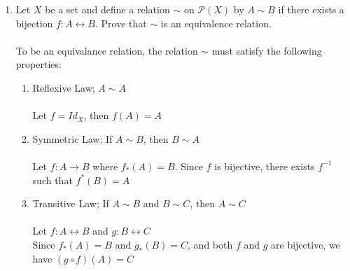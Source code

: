 \documentclass[11pt]{article}
\begin{document}
\begin{enumerate}
\newpage
\item Let $X$ be a set and define a relation $\sim$ on $\mathcal{P}(X)$ by $A \sim B$ if there exists a bijection $f:A \leftrightarrow B$.  Prove that $\sim$ is an equivalence relation.
\\\\
To be an equivalance relation, the relation $\sim$ must satisfy the following properties:
\begin{enumerate}
\item Reflexive Law; $A \sim A$\\
\\
Let $f = Id_X$, then $f(A) = A$\\
\item Symmetric Law; If $A \sim B$, then $B \sim A$\\
\\Let $f:A \to B$ where $f_*(A) = B$.  Since $f$ is bijective, there exists $f^{-1}$ such that 	$f^*(B) = A$
\\
\item Transitive Law; If $A \sim B$ and $B \sim C$, then $A \sim C$\\
\\
Let $f:A \leftrightarrow B$ and $g:B \leftrightarrow C$
\\
Since $f_*(A) = B$ and $g_*(B) = C$, and both $f$ and $g$ are bijective, we have $(g \circ f)(A) = C$
\end{enumerate}
\end{enumerate} %
\end{document}
